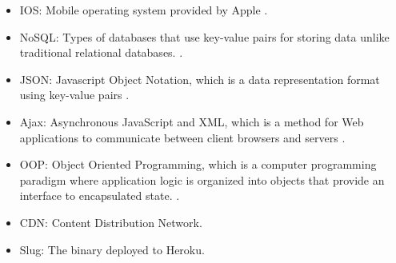 \begin{itemize}
\item IOS: Mobile operating system provided by Apple \cite{IOS}.
\item NoSQL: Types of databases that use key-value pairs for storing data unlike traditional relational databases. \cite{NoSql}.
\item JSON: Javascript Object Notation, which is a data representation format using key-value pairs \cite{json}.
\item Ajax:  Asynchronous JavaScript and XML, which is a method for Web applications to communicate between client browsers and servers \cite{Ajax}.
\item OOP: Object Oriented Programming, which is a computer programming paradigm where application logic is organized into objects that provide an interface to encapsulated state. \cite{OOP}.
\item CDN: Content Distribution Network.
\item Slug: The binary deployed to Heroku.
\end{itemize}


